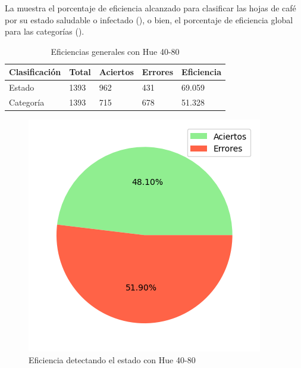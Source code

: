 La  muestra el porcentaje de eficiencia alcanzado para clasificar las hojas de café por su estado saludable o infectado (), o bien, el porcentaje de eficiencia global para las categorías ().

\begin{table}[h!]
\centering
\begin{tabular}{|l|l|l|l|l|}
\hline 
\textbf{Clasificación} & \textbf{Total} & \textbf{Aciertos} & \textbf{Errores} & \textbf{Eficiencia} \\
\hline
Estado & 1393 & 962 & 431 & 69.059 \\
\hline 
Categoría & 1393 & 715 & 678 & 51.328 \\
\hline 
\end{tabular}
\caption{Eficiencias generales con Hue 40-80}
\label{table:efficiency_general_40_80}
\end{table}

\captionsetup[figure]{skip=-10pt}

\begin{figure}[H]
\centering
\includegraphics[scale=0.6]{images/result_global_state_40_80.png}
\caption{Eficiencia detectando el estado con Hue 40-80}
\label{img:efficiency_state_40_80}
\end{figure}


